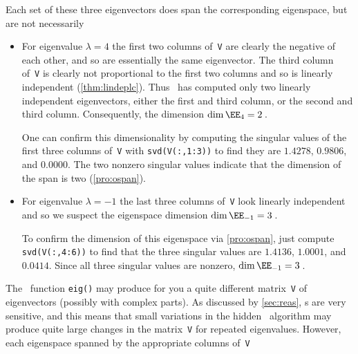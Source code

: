 \begin{example}
\begin{solution}
Each set of these three eigenvectors does span the corresponding eigenspace, but are not necessarily 
\begin{itemize}
\item For eigenvalue \(\lambda=4\) the first two columns of~\verb|V| are clearly the negative of each other, and so are essentially the same eigenvector.  
The third column of~\verb|V| is clearly not proportional to the first two columns and so is linearly independent (\cref{thm:lindeplc}).
Thus \script\ has computed only two linearly independent eigenvectors, either the first and third column, or the second and third column.
Consequently, the dimension \(\dim\EE_4=2\)\,.

One can confirm this dimensionality by computing the singular values 
of the first three columns of~\verb|V| with \verb|svd(V(:,1:3))| to find they are \(1.4278\), \(0.9806\), and \(0.0000\).
The two nonzero singular values indicate that the dimension of the span is two (\cref{pro:ospan}).

\item For eigenvalue \(\lambda=-1\) the last three columns of~\verb|V| look linearly independent and so we suspect the eigenspace dimension \(\dim\EE_{-1}=3\)\,.

To confirm the dimension of this eigenspace via \cref{pro:ospan}, just compute \verb|svd(V(:,4:6))| to find that the three singular values are \(1.4136\), \(1.0001\), and \(0.0414\).
Since all three singular values are nonzero, \(\dim\EE_{-1}=3\)\,.
\end{itemize}
\end{solution}
The \script\ function \verb|eig()| may produce for you a quite different matrix~\verb|V| of eigenvectors (possibly with complex parts). 
As discussed by \cref{sec:reas}, s are very sensitive, and this  means that small variations in the hidden \script\ algorithm may produce quite large changes in the matrix~\verb|V| for repeated eigenvalues.
However, each eigenspace spanned by the appropriate columns of~\verb|V| 
\end{example}

